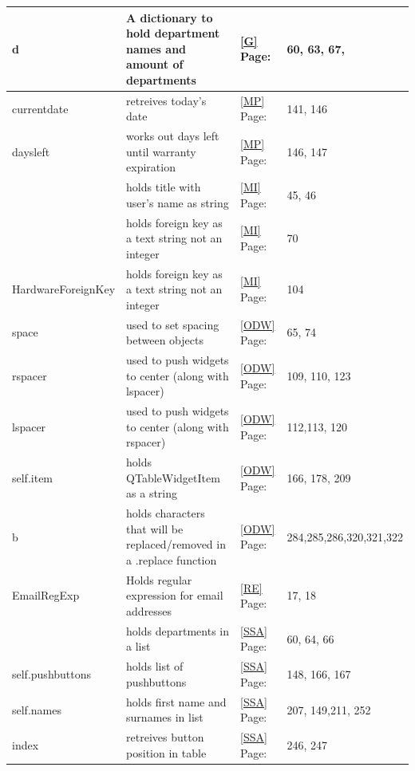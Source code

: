 \begin{center}
\begin{longtable}{|p{4cm}|p{3cm}|p{2cm}|p{3cm}|}
d & A dictionary to hold department names and amount of departments& \ref{G} Page: \pageref{G} & 60, 63, 67,  \\ \hline 

currentdate & retreives today's date& \ref{MP} Page: \pageref{MP} & 141, 146  \\ \hline
daysleft & works out days left until warranty expiration& \ref{MP} Page: \pageref{MP} & 146, 147  \\ \hline

\verb name_lbl & holds title with user's name as string& \ref{MI} Page: \pageref{MI} & 45, 46  \\ \hline
\verb Foreign_Item & holds foreign key as a text string not an integer & \ref{MI} Page: \pageref{MI} & 70\\ \hline
HardwareForeignKey & holds foreign key as a text string not an integer & \ref{MI} Page: \pageref{MI} & 104 \\ \hline

space & used to set spacing between objects& \ref{ODW} Page: \pageref{ODW} & 65, 74  \\ \hline
rspacer & used to push widgets to center (along with lspacer)& \ref{ODW} Page: \pageref{ODW} & 109, 110, 123 \\ \hline
lspacer & used to push widgets to center (along with rspacer)& \ref{ODW} Page: \pageref{ODW} & 112,113, 120 \\ \hline
self.item & holds QTableWidgetItem as a string & \ref{ODW}  Page: \pageref{ODW}& 166, 178, 209 \\ \hline
b &holds characters that will be replaced/removed in a .replace function& \ref{ODW} Page: \pageref{ODW} &284,285,286,320,321,322 \\ \hline

EmailRegExp & Holds regular expression for email addresses& \ref{RE} Page: \pageref{RE} & 17, 18  \\ \hline

\verb field_names & holds departments in a list& \ref{SSA} Page: \pageref{SSA} &  60, 64, 66  \\ \hline
self.pushbuttons & holds list of pushbuttons & \ref{SSA} Page: \pageref{SSA} & 148, 166, 167\\ \hline
self.names & holds first name and surnames in list& \ref{SSA} Page: \pageref{SSA} & 207, 149,211, 252  \\ \hline
index & retreives button position in table& \ref{SSA} Page: \pageref{SSA} & 246, 247 \\ \hline









\end{longtable}
\end{center}

